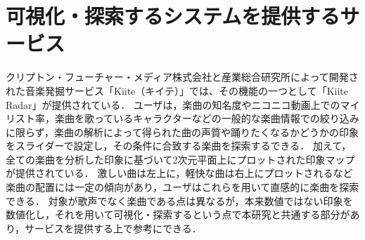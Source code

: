 \section{可視化・探索するシステムを提供するサービス}
クリプトン・フューチャー・メディア株式会社と産業総合研究所によって開発された音楽発掘サービス「Kiite（キイテ）」では、その機能の一つとして「Kiite Radar」が提供されている\cite{kiite}．
ユーザは，楽曲の知名度やニコニコ動画上でのマイリスト率，楽曲を歌っているキャラクターなどの一般的な楽曲情報での絞り込みに限らず，楽曲の解析によって得られた曲の声質や踊りたくなるかどうかの印象をスライダーで設定し，その条件に合致する楽曲を探索するできる．
加えて，全ての楽曲を分析した印象に基づいて2次元平面上にプロットされた印象マップが提供されている．
激しい曲は左上に，軽快な曲は右上にプロットされるなど楽曲の配置には一定の傾向があり，ユーザはこれらを用いて直感的に楽曲を探索できる．
対象が歌声でなく楽曲である点は異なるが，本来数値ではない印象を数値化し，それを用いて可視化・探索するという点で本研究と共通する部分があり，サービスを提供する上で参考にできる．

